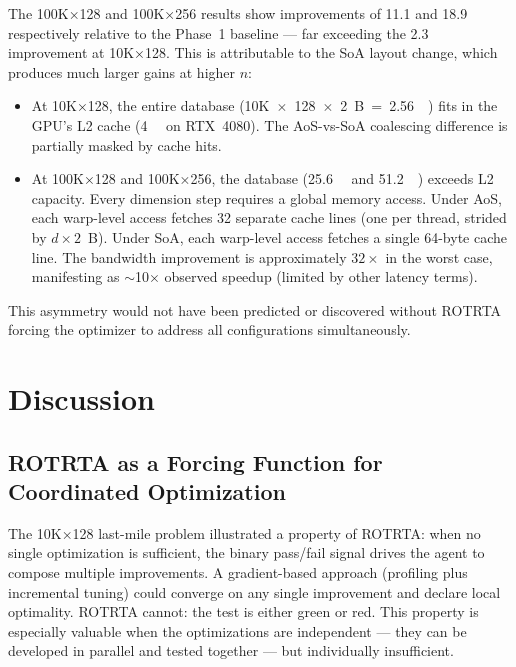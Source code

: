 \documentclass[conference]{IEEEtran}
\begin{document}
The 100K×128 and 100K×256 results show improvements of \SI{11.1}{\times}
and \SI{18.9}{\times} respectively relative to the Phase~1 baseline ---
far exceeding the \SI{2.3}{\times} improvement at 10K×128.  This is
attributable to the SoA layout change, which produces much larger gains at
higher $n$:

\begin{itemize}
  \item At 10K×128, the entire database (10K~$\times$~128~$\times$~2~B~=~\SI{2.56}{\mega\byte})
        fits in the GPU's L2 cache (\SI{4}{\mega\byte} on RTX~4080).
        The AoS-vs-SoA coalescing difference is partially masked by cache hits.
  \item At 100K×128 and 100K×256, the database (\SI{25.6}{\mega\byte}
        and \SI{51.2}{\mega\byte}) exceeds L2 capacity.  Every dimension
        step requires a global memory access.  Under AoS, each warp-level
        access fetches 32 separate cache lines (one per thread, strided by
        $d \times 2$~B).  Under SoA, each warp-level access fetches a single
        64-byte cache line.  The bandwidth improvement is approximately
        $32\times$ in the worst case, manifesting as $\sim$10$\times$ observed
        speedup (limited by other latency terms).
\end{itemize}

This asymmetry would not have been predicted or discovered without ROTRTA
forcing the optimizer to address all configurations simultaneously.

\section{Discussion}
\label{sec:discussion}

\subsection{ROTRTA as a Forcing Function for Coordinated Optimization}

The 10K×128 last-mile problem illustrated a property of ROTRTA: when no
single optimization is sufficient, the binary pass/fail signal drives the
agent to compose multiple improvements.  A gradient-based approach (profiling
plus incremental tuning) could converge on any single improvement and declare
local optimality.  ROTRTA cannot: the test is either green or red.  This
property is especially valuable when the optimizations are independent ---
they can be developed in parallel and tested together --- but individually
insufficient.
\end{document}
